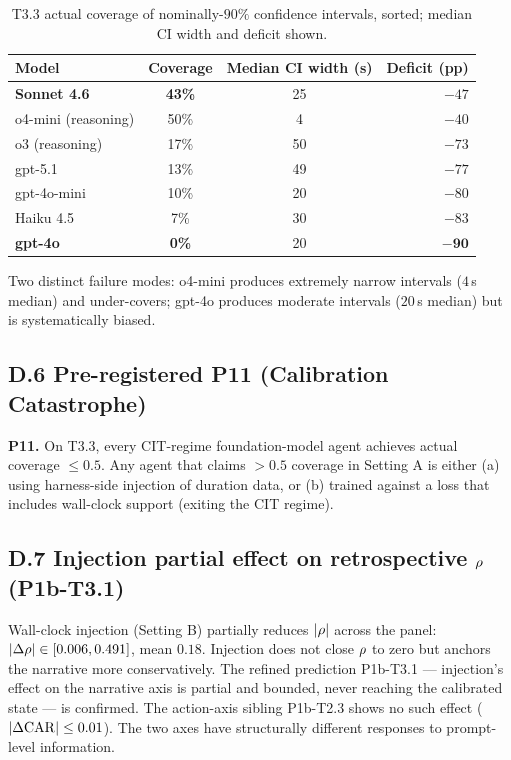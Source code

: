 \begin{table}[h]
\centering
\caption{T3.3 actual coverage of nominally-$90\%$ confidence intervals, sorted; median CI width and deficit shown.}
\label{tab:t33-coverage}
\small
\begin{tabular}{lccr}
\toprule
Model & Coverage & Median CI width (s) & Deficit (pp) \\
\midrule
\textbf{Sonnet 4.6} & \textbf{43\%} & 25 & $-47$ \\
o4-mini (reasoning) & 50\% & 4 & $-40$ \\
o3 (reasoning) & 17\% & 50 & $-73$ \\
gpt-5.1 & 13\% & 49 & $-77$ \\
gpt-4o-mini & 10\% & 20 & $-80$ \\
Haiku 4.5 & 7\% & 30 & $-83$ \\
\textbf{gpt-4o} & \textbf{0\%} & 20 & $\mathbf{-90}$ \\
\bottomrule
\end{tabular}
\end{table}

Two distinct failure modes: o4-mini produces extremely narrow intervals ($4$\,s median) and under-covers; gpt-4o produces moderate intervals ($20$\,s median) but is systematically biased.

\subsection*{D.6 Pre-registered P11 (Calibration Catastrophe)}

\textbf{P11.} On T3.3, every CIT-regime foundation-model agent achieves actual coverage $\leq 0.5$. Any agent that claims $> 0.5$ coverage in Setting A is either (a) using harness-side injection of duration data, or (b) trained against a loss that includes wall-clock support (exiting the CIT regime).

\subsection*{D.7 Injection partial effect on retrospective $\rho$ (P1b-T3.1)}

Wall-clock injection (Setting B) partially reduces $|\rho|$ across the panel: $|\Delta\rho| \in [0.006, 0.491]$, mean $0.18$. Injection does not close $\rho$ to zero but anchors the narrative more conservatively. The refined prediction P1b-T3.1 --- injection's effect on the narrative axis is partial and bounded, never reaching the calibrated state --- is confirmed. The action-axis sibling P1b-T2.3 shows no such effect ($|\Delta\mathrm{CAR}| \leq 0.01$). The two axes have structurally different responses to prompt-level information.


